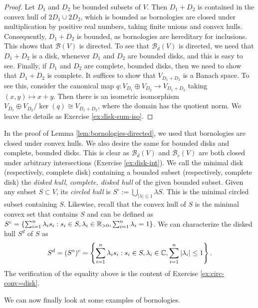 \begin{proof}
    Let \(D_1\) and \(D_2\) be bounded subsets of \(V\). Then \(D_1 + D_2\) is contained in the convex hull of \(2D_1 \cup 2D_2\), which is bounded as bornologies are closed under multiplication by positive real numbers, taking finite unions and convex hulls. Consequently, \(D_1 + D_2\) is bounded, as bornologies are hereditary for inclusions. This shows that \(\mathcal{B}(V)\) is directed. To see that \(\mathcal{B}_d(V)\) is directed, we need that \(D_1 + D_2\) is a disk, whenever \(D_1\) and \(D_2\) are bounded disks, and this is easy to see. Finally, if \(D_1\) and \(D_2\) are complete, bounded disks, then we need to show that \(D_1 + D_2\) is complete. It suffices to show that \(V_{D_1 + D_2}\) is a Banach space. To see this, consider the canonical map \(q \colon V_{D_1} \oplus V_{D_2} \to V_{D_1 + D_2}\) taking \((x,y) \mapsto x + y\). Then there is an isometric isomorphism \(V_{D_1} \oplus V_{D_2}/\ker(q) \cong V_{D_1 + D_2}\), where the domain has the quotient norm. We leave the 
    details as Exercise \ref{ex:disk-sum-iso}.
\end{proof}

In the proof of Lemma \ref{lem:bornologies-directed}, we used that bornologies are closed under convex hulls. We also desire the same for bounded disks and complete, bounded disks. This is clear as \(\mathcal{B}_d(V)\) and \(\mathcal{B}_c(V)\) are both closed under arbitrary intersections (Exercise \ref{ex:disk-int}). We call the minimal disk (respectively, complete disk) containing a bounded subset (respectively, complete disk) the \emph{disked hull}, \emph{complete, disked hull} of the given bounded subset.
Given any subset
$S \subset V$, its \emph{circled hull} is $S^{\circ} := \bigcup_{|\lambda| \le 1} \lambda S$. This is the minimal circled subset containing $S$. Likewise, 
recall that the convex hull of $S$ is 
the minimal convex set that contains $S$ and can be defined as $S^c = \{\sum_{i=1}^n \lambda_i s_i : s_i \in S, \lambda_i \in \mathbb R_{>0}, \sum_{i=1}^n \lambda_i = 1\}$.
We can characterize 
the disked hull $S^d$ of $S$ as
\begin{equation}\label{eq:Sd=Scc}
    S^d = (S^\circ)^c = \left\{\sum_{i=1}^n \lambda_i s_i : s_i \in S, \lambda_i \in \mathbb C, \sum_{i=1}^n |\lambda_i| \le 1\right\}.
\end{equation}
The verification of the equality above
is the content of Exercise \ref{ex:circ-conv=disk}.

We can now finally look at some examples of bornologies.

